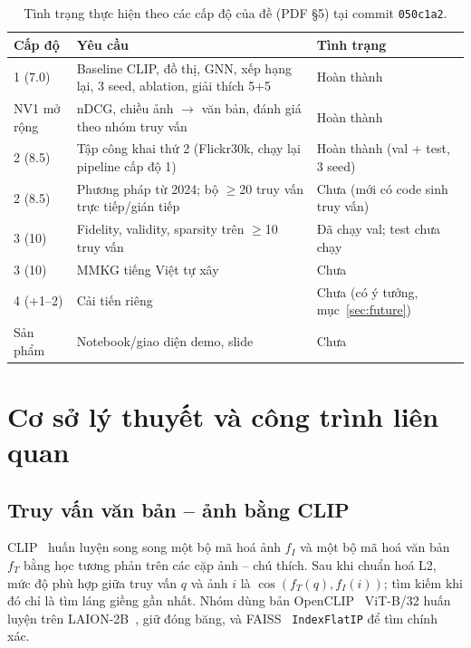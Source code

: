 \documentclass[12pt, a4paper]{article}
\newcommand{\code}[1]{\texttt{#1}}
\begin{document}
\begin{table}[H]
\centering\small
\caption{Tình trạng thực hiện theo các cấp độ của đề (PDF §5) tại commit \code{050c1a2}.}
\label{tab:tiendo}
\begin{tabularx}{\linewidth}{l X l}
\toprule
\textbf{Cấp độ} & \textbf{Yêu cầu} & \textbf{Tình trạng} \\
\midrule
1 (7.0) & Baseline CLIP, đồ thị, GNN, xếp hạng lại, 3 seed, ablation, giải thích 5+5 & Hoàn thành \\
NV1 mở rộng & nDCG, chiều ảnh $\to$ văn bản, đánh giá theo nhóm truy vấn & Hoàn thành \\
2 (8.5) & Tập công khai thứ 2 (Flickr30k, chạy lại pipeline cấp độ 1) & Hoàn thành (val + test, 3 seed) \\
2 (8.5) & Phương pháp từ 2024; bộ $\ge$20 truy vấn trực tiếp/gián tiếp & Chưa (mới có code sinh truy vấn) \\
3 (10) & Fidelity, validity, sparsity trên $\ge$10 truy vấn & Đã chạy val; test chưa chạy \\
3 (10) & MMKG tiếng Việt tự xây & Chưa \\
4 (+1--2) & Cải tiến riêng & Chưa (có ý tưởng, mục~\ref{sec:future}) \\
Sản phẩm & Notebook/giao diện demo, slide & Chưa \\
\bottomrule
\end{tabularx}
\end{table}

\section{Cơ sở lý thuyết và công trình liên quan}

\subsection{Truy vấn văn bản -- ảnh bằng CLIP}
CLIP~\cite{radford2021clip} huấn luyện song song một bộ mã hoá ảnh $f_I$ và một bộ mã hoá văn bản $f_T$ bằng học tương phản trên các cặp ảnh -- chú thích. Sau khi chuẩn hoá L2, mức độ phù hợp giữa truy vấn $q$ và ảnh $i$ là $\cos(f_T(q), f_I(i))$; tìm kiếm khi đó chỉ là tìm láng giềng gần nhất. Nhóm dùng bản OpenCLIP~\cite{cherti2023openclip} ViT-B/32 huấn luyện trên LAION-2B~\cite{schuhmann2022laion}, giữ đóng băng, và FAISS~\cite{johnson2019faiss} \code{IndexFlatIP} để tìm chính xác.
\end{document}
